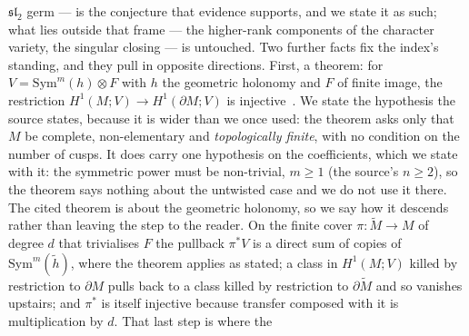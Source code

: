 \documentclass[11pt,a4paper]{article}
\theoremstyle{definition}
\theoremstyle{remark}
\begin{document}
$\mathfrak{sl}_2$ germ --- is the conjecture that evidence supports, and we state it as such; what lies outside
that frame --- the higher-rank components of the character variety, the singular closing --- is untouched. Two further facts fix the index's standing, and they pull in opposite directions. First, a theorem: for $V = \mathrm{Sym}^m(h) \otimes F$ with $h$ the geometric holonomy and $F$ of finite image, the restriction $H^1(M;V) \to H^1(\partial M;V)$ is injective~\cite{mfp}. We state the hypothesis the source states, because it is wider than we once used: the theorem asks only that $M$ be complete, non-elementary and \emph{topologically finite}, with no condition on the number of cusps. It does carry one hypothesis on the coefficients, which we state with it: the symmetric power must be non-trivial, $m \ge 1$ (the source's $n \ge 2$), so the theorem says nothing about the untwisted case and we do not use it there. The cited theorem is
about the geometric holonomy, so we say how it descends rather than leaving the step to the reader. On the finite cover
$\pi: \widetilde M \to M$ of degree $d$ that trivialises $F$ the pullback $\pi^*V$ is a direct sum of copies of
$\mathrm{Sym}^m(\widetilde h)$, where the theorem applies as stated; a class in $H^1(M;V)$ killed by restriction to
$\partial M$ pulls back to a class killed by restriction to $\partial\widetilde M$ and so vanishes upstairs; and $\pi^*$
is itself injective because transfer composed with it is multiplication by $d$. That last step is where the
\end{document}
